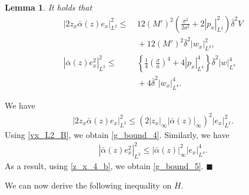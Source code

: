 \documentclass[twocolumn]{autart}
\newtheorem{lemm}{Lemma}
\newenvironment{lemma}{\begin{lemm}}{\hfill \end{lemm}}
\newenvironment{proof}{{\it Proof. }}{\hfill $\blacksquare$ }
\begin{document}
\begin{lemma}
It holds that
\begin{align}
|2z_x\bar{\alpha}(z)e_x|_{L^2}^2 \leq&~ 12(M')^2\left(\frac{\sigma^2}{2a^2}+2|p_x|_{L^2}^2\right)\bar{\delta}^2V \nonumber \\
&~+12(M')^2\bar{\delta}^2|w_x|_{L^2}^2,\label{g_bound_4}\\
|\bar{\alpha}(z)e_x^2|_{L^2}^2 \leq&~ \left\{\frac{1}{4}\left(\frac{\sigma}{a}\right)^4+4|p_x|_{L^4}^4\right\}\bar{\delta}^2|w|_{L^4}^4 \nonumber \\
&~+4\bar{\delta}^2|w_x|_{L^4}^4. \label{g_bound_5}
\end{align}
\hfill  
\end{lemma}
\begin{proof}
We have 
\begin{align*}
|2z_x\bar{\alpha}(z)e_x|_{L^2}^2 \leq \left(2|z_x|_{\infty} |\bar{\alpha}(z)|_{\infty}\right)^2|e_x|_{L^2}^2. 
\end{align*}
Using \eqref{vx_L2_B}, we obtain \eqref{g_bound_4}. Similarly, we have 
\begin{align*}
|\bar{\alpha}(z)e_x^2|_{L^2}^2 \leq |\bar{\alpha}(z)|_{\infty}^2|e_x|_{L^4}^4.
\end{align*}
As a result, using \eqref{z_x_4_b}, we obtain \eqref{g_bound_5}. 
\end{proof}

We can now derive the following inequality on $\dot{H}$. 
\end{document}

